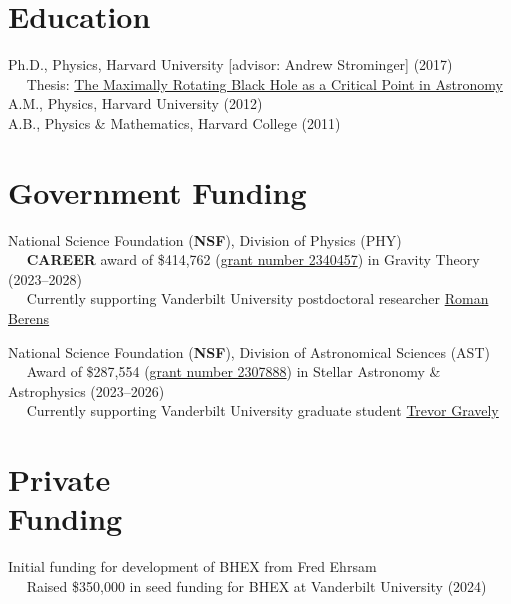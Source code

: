 \documentclass[margin,line]{resume}
\begin{document}
\begin{resume}
\section{\mysidestyle Education}

Ph.D., Physics, Harvard University [advisor: Andrew Strominger] (2017) \\
\mbox{ }\mbox{ } Thesis: \href{http://nrs.harvard.edu/urn-3:HUL.InstRepos:40046542}{The Maximally Rotating Black Hole as a Critical Point in Astronomy}
\vspace{2mm} \\
%
A.M., Physics, Harvard University (2012)
\vspace{2mm} \\
%
A.B., Physics \& Mathematics, Harvard College (2011)

\section{\mysidestyle Government Funding}

National Science Foundation (\textbf{NSF}), Division of Physics (PHY) \\
\mbox{ }\mbox{ } \textbf{CAREER} award of \$414,762 (\href{https://www.nsf.gov/awardsearch/showAward?AWD_ID=2340457}{grant number 2340457}) in Gravity Theory (2023--2028) \\
\mbox{ }\mbox{ } Currently supporting Vanderbilt University postdoctoral researcher \href{https://www.romanberens.com/}{Roman Berens}

National Science Foundation (\textbf{NSF}), Division of Astronomical Sciences (AST) \\
\mbox{ }\mbox{ } Award of \$287,554 (\href{https://www.nsf.gov/awardsearch/showAward?AWD_ID=2307888}{grant number 2307888}) in Stellar Astronomy \& Astrophysics (2023--2026) \\
\mbox{ }\mbox{ } Currently supporting Vanderbilt University graduate student \href{https://github.com/graveltr}{Trevor Gravely}

\section{\mysidestyle Private\\ Funding}

Initial funding for development of BHEX from Fred Ehrsam \\
	\mbox{ }\mbox{ } Raised \$350,000 in seed funding for BHEX at Vanderbilt University (2024)
	

\end{resume}
\end{document}
